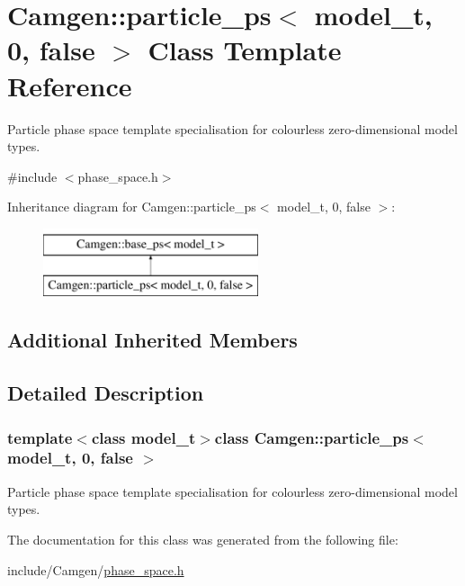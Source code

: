 \hypertarget{a00407}{}\section{Camgen\+:\+:particle\+\_\+ps$<$ model\+\_\+t, 0, false $>$ Class Template Reference}
\label{a00407}


Particle phase space template specialisation for colourless zero-\/dimensional model types.  




{\ttfamily \#include $<$phase\+\_\+space.\+h$>$}

Inheritance diagram for Camgen\+:\+:particle\+\_\+ps$<$ model\+\_\+t, 0, false $>$\+:\begin{figure}[H]
\begin{center}
\leavevmode
\includegraphics[height=2.000000cm]{a00407}
\end{center}
\end{figure}
\subsection*{Additional Inherited Members}


\subsection{Detailed Description}
\subsubsection*{template$<$class model\+\_\+t$>$class Camgen\+::particle\+\_\+ps$<$ model\+\_\+t, 0, false $>$}

Particle phase space template specialisation for colourless zero-\/dimensional model types. 

The documentation for this class was generated from the following file\+:\begin{DoxyCompactItemize}
\item 
include/\+Camgen/\hyperlink{a00718}{phase\+\_\+space.\+h}\end{DoxyCompactItemize}
